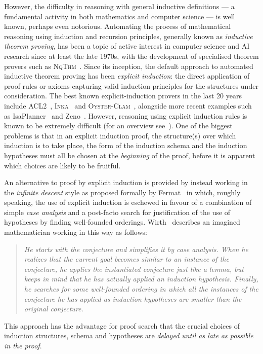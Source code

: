 \documentclass[11pt,twocolumn]{article}
\begin{document}
However, the difficulty in reasoning with general inductive definitions --- a fundamental activity in both mathematics and computer science --- is well known, perhaps even notorious. Automating the process of mathematical reasoning using induction and recursion principles, generally known as \emph{inductive theorem proving}, has been a topic of active interest in computer science and AI research since at least the late 1970s, with the development of specialised theorem provers such as \textsc{NqThm}~\cite{Boyer-Moore:79}.
Since its inception, the default approach to automated inductive theorem proving has been \emph{explicit induction}: the direct application of proof rules or axioms capturing valid induction principles for the structures under consideration.  The best known explicit-induction provers in the last 20 years include ACL2~\cite{Kaufmann-Monolios-Moore:00}, \textsc{Inka}~\cite{Autexier-etal:99} and \textsc{Oyster-Clam}~\cite{Bundy-etal:90}, alongside more recent examples such as IsaPlanner~\cite{Dixon:PhD} and Zeno~\cite{Sonnex-etal:12}.  However, reasoning using explicit induction rules is known to be extremely difficult (for an overview see~\cite{Bundy:01}).  One of the biggest problems is that in an explicit induction proof, the structure(s) over which induction is to take place, the form of the induction schema and the induction hypotheses must all be chosen at the \emph{beginning} of the proof, before it is apparent which choices are likely to be fruitful.

An alternative to proof by explicit induction is provided by instead working in the \emph{infinite descent} style as proposed formally by Fermat~\cite{Mahoney:94} in which, roughly speaking, the use of explicit induction is eschewed in favour of a combination of simple \emph{case analysis} and a post-facto search for justification of the use of hypotheses by finding well-founded orderings.  Wirth~\cite{Wirth:Tech06} describes an imagined mathematician working in this way as follows:
\begin{quote}
{\em He starts with the conjecture and simplifies it by case analysis. When he realizes
that the current goal becomes similar to an instance of the conjecture, he applies
the instantiated conjecture just like a lemma, but keeps in mind that he has actually
applied an induction hypothesis. Finally, he searches for some well-founded ordering
in which all the instances of the conjecture he has applied as induction hypotheses
are smaller than the original conjecture.}%
\end{quote}
This approach has the advantage for proof search that the crucial choices of induction structures, schema and hypotheses are \emph{delayed until as late as possible in the proof}.
\end{document}
